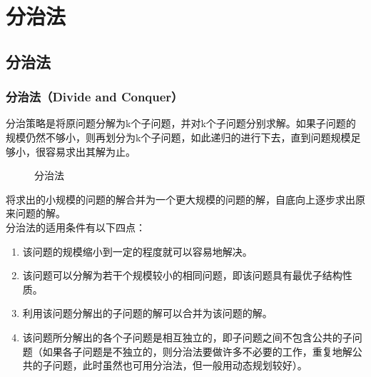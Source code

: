 \chapter{分治法}

\section{分治法}

\subsection{分治法（Divide and Conquer）}

分治策略是将原问题分解为k个子问题，并对k个子问题分别求解。如果子问题的规模仍然不够小，则再划分为k个子问题，如此递归的进行下去，直到问题规模足够小，很容易求出其解为止。\\

\begin{figure}[H]
	\centering
	\caption{分治法}
\end{figure}

将求出的小规模的问题的解合并为一个更大规模的问题的解，自底向上逐步求出原来问题的解。\\

分治法的适用条件有以下四点：

\begin{enumerate}
	\item 该问题的规模缩小到一定的程度就可以容易地解决。

	\item 该问题可以分解为若干个规模较小的相同问题，即该问题具有最优子结构性质。

	\item 利用该问题分解出的子问题的解可以合并为该问题的解。

	\item 该问题所分解出的各个子问题是相互独立的，即子问题之间不包含公共的子问题（如果各子问题是不独立的，则分治法要做许多不必要的工作，重复地解公共的子问题，此时虽然也可用分治法，但一般用动态规划较好）。
\end{enumerate}

